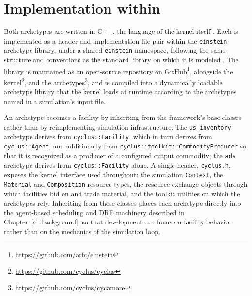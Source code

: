 \section{Implementation within \Cyclus}
\label{sec:method-implementation}

Both archetypes are written in C++, the language of the \Cyclus kernel itself
\cite{huff_fundamental_2016}. Each is implemented as a header and
implementation file pair within the \texttt{einstein} archetype library,
under a shared \texttt{einstein} namespace, following the same structure and
conventions as the standard \Cycamore library on which it is
modeled \cite{carlsen_cycamore_2014}. The library is maintained as an
open-source repository on GitHub\footnote{\url{https://github.com/arfc/einstein}},
alongside the \Cyclus kernel\footnote{\url{https://github.com/cyclus/cyclus}},
and the \Cycamore archetypes\footnote{\url{https://github.com/cyclus/cycamore}},
and is compiled into a dynamically loadable archetype library that the
\Cyclus kernel loads at runtime according to the archetypes named in a
simulation's input file.

An archetype becomes a \Cyclus facility by inheriting from the framework's
base classes rather than by reimplementing simulation infrastructure. The
\texttt{us\_inventory} archetype derives from \texttt{cyclus::Facility}, which
in turn derives from \texttt{cyclus::Agent}, and additionally from
\texttt{cyclus::toolkit::CommodityProducer} so that it is recognized as a
producer of a configured output commodity; the \texttt{ads} archetype derives
from \texttt{cyclus::Facility} alone. A single header, \texttt{cyclus.h},
exposes the kernel interface used throughout: the simulation
\texttt{Context}, the \texttt{Material} and \texttt{Composition} resource
types, the resource exchange objects through which facilities bid on and trade
material, and the toolkit utilities on which the archetypes rely. Inheriting
from these classes places each archetype directly into the agent-based
scheduling and \gls{DRE} machinery described in Chapter~\ref{ch:background},
so that development can focus on facility behavior rather than on the
mechanics of the simulation loop.

